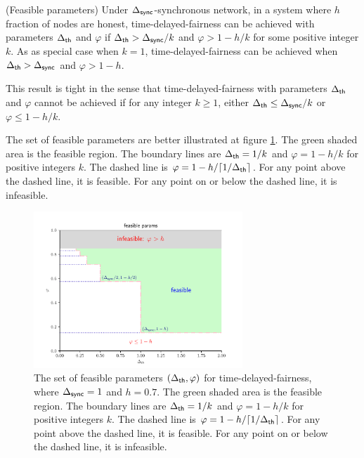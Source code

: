 {
\color{brown}

\begin{theorem}{(Feasible parameters)} \label{thm:possibility}
    Under $\Delta_{\mathsf{sync}}$-synchronous network, in a system  where $h$ fraction of nodes are honest, time-delayed-fairness can be achieved with parameters $\Delta_{\mathsf{th}}$ and $\varphi$ if $\Delta_{\mathsf{th}}>\Delta_{\mathsf{sync}}/k$ and $\varphi>1-h/k$ for some positive integer $k$. As as special case when $k=1$, time-delayed-fairness can be achieved when $\Delta_{\mathsf{th}}>\Delta_{\mathsf{sync}}$ and $\varphi>1-h$.

    This result is tight in the sense that time-delayed-fairness with parameters $\Delta_{\mathsf{th}}$ and $\varphi$ cannot be achieved if for any integer $k\ge 1$, either $\Delta_{\mathsf{th}}\leq \Delta_{\mathsf{sync}}/k$ or $\varphi\leq 1-h/k$.
\end{theorem}

The set of feasible parameters are better illustrated at figure \ref{fig:params}. The green shaded area is the feasible region. The boundary lines are $\Delta_{\mathsf{th}}=1/k$ and $\varphi=1-h/k$ for positive integers $k$. The dashed line is $\varphi=1-h/\lceil 1/\Delta_{\mathsf{th}} \rceil$. For any point above the dashed line, it is feasible. For any point on or below the dashed line, it is infeasible.

\begin{figure}[htp]
    \centering
    \includegraphics[width=0.7\textwidth]{plots/param.pdf}
    \caption{The set of feasible parameters $(\Delta_{\mathsf{th}}, \varphi)$ for time-delayed-fairness, where $\Delta_{\mathsf{sync}}=1$ and $h=0.7$. The green shaded area is the feasible region. The boundary lines are $\Delta_{\mathsf{th}}=1/k$ and $\varphi=1-h/k$ for positive integers $k$. The dashed line is $\varphi=1-h/\lceil 1/\Delta_{\mathsf{th}} \rceil$. For any point above the dashed line, it is feasible. For any point on or below the dashed line, it is infeasible. }
    \label{fig:params}
\end{figure}

}
